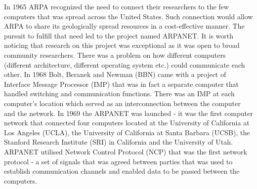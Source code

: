 \documentclass[magisterska,en]{pracamgr}
\begin{document}
In 1965 ARPA recognized the need to connect their researchers to the few computers that was spread across the United States. Such connection would allow ARPA to share its geologically spread resources in a cost-effective manner. The pursuit to fulfill that need led to the project named ARPANET. It is worth noticing that research on this project was exceptional as it was open to broad community researchers.\cite{an_early_history_of_the_internet} There was a problem on how different computers (different architecture, different operating system etc.) could communicate each other. In 1968 Bolt, Beranek and Newman (BBN) came with a project of Interface Message Processor (IMP) that was in fact a separate computer that handled switching and communication functions. There was an IMP at each computer's location which served as an interconnection between the computer and the network. In 1969 the ARPANET was launched - it was the first computer network that connected four computers located at the University of California at Los Angeles (UCLA), the University of California at Santa Barbara (UCSB), the Stanford Research Institute (SRI) in California and the University of Utah. ARPANET utilised Network Control Protocol (NCP) that was the first network protocol - a set of signals that was agreed between parties that was used to establish communication channels and enabled data to be passed between the computers.
\end{document}
